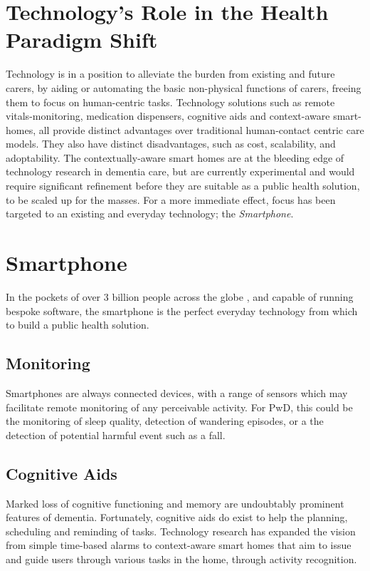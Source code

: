 \section{Technology's Role in the Health Paradigm Shift}
Technology is in a position to alleviate the burden from existing and future carers, by aiding or automating the basic non-physical functions of carers, freeing them to focus on human-centric tasks.
Technology solutions such as remote vitals-monitoring, medication dispensers, cognitive aids and context-aware smart-homes, all provide distinct advantages over traditional human-contact centric care models. They also have distinct disadvantages, such as cost, scalability, and adoptability. The contextually-aware smart homes are at the bleeding edge of technology research in dementia care, but are currently experimental and would require significant refinement before they are suitable as a public health solution, to be scaled up for the masses.
For a more immediate effect, focus has been targeted to an existing and everyday technology; the \textit{Smartphone}.

\section{Smartphone}
In the pockets of over 3 billion people across the globe \cite{EricssonMobilityReport2016}, and capable of running bespoke software, the smartphone is the perfect everyday technology from which to build a public health solution. 

\subsection{Monitoring}
Smartphones are always connected devices, with a range of sensors which may facilitate remote monitoring of any perceivable activity. For PwD, this could be the monitoring of sleep quality, detection of wandering episodes, or a the detection of potential harmful event such as a fall.

\subsection{Cognitive Aids}
Marked loss of cognitive functioning and memory are undoubtably prominent features of dementia. Fortunately, cognitive aids do exist to help the planning, scheduling and reminding of tasks. Technology research has expanded the vision from simple time-based alarms to context-aware smart homes that aim to issue and guide users through various tasks in the home, through activity recognition.

